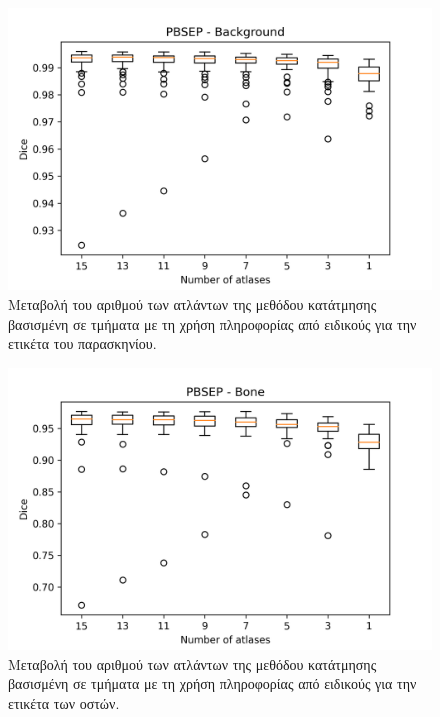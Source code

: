 \documentclass[a4paper,12pt]{article}
\begin{document}
\begin{figure}[H]
    \centering
    \includegraphics[width=0.85\linewidth]{PBSEP_Number_of_atlases_Background_plot.png}
    \caption{Μεταβολή του αριθμού των ατλάντων της μεθόδου κατάτμησης βασισμένη
             σε τμήματα με τη χρήση πληροφορίας από ειδικούς για την ετικέτα του
             παρασκηνίου.}
    \label{fig:PBSEP:atlases:1}
\end{figure}

\begin{figure}[H]
    \centering
    \includegraphics[width=0.85\linewidth]{PBSEP_Number_of_atlases_Bone_plot.png}
    \caption{Μεταβολή του αριθμού των ατλάντων της μεθόδου κατάτμησης βασισμένη
             σε τμήματα με τη χρήση πληροφορίας από ειδικούς για την ετικέτα των
             οστών.}
    \label{fig:PBSEP:atlases:2}
\end{figure}
\end{document}
